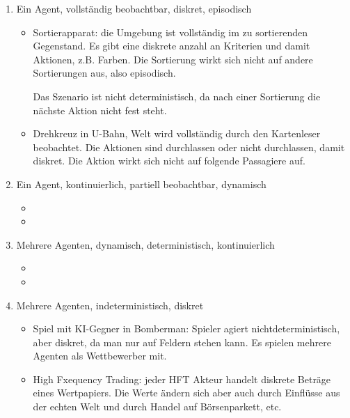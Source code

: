 \begin{enumerate}
	\item Ein Agent, vollständig beobachtbar, diskret, episodisch
	\begin{itemize}
		\item Sortierapparat: die Umgebung ist vollständig im zu sortierenden Gegenstand. Es gibt eine diskrete anzahl an Kriterien und damit Aktionen, z.B. Farben. Die Sortierung wirkt sich nicht auf andere Sortierungen aus, also episodisch.
		
		Das Szenario ist nicht deterministisch, da nach einer Sortierung die nächste Aktion nicht fest steht.
		
		\item Drehkreuz in U-Bahn, Welt wird vollständig durch den Kartenleser beobachtet. Die Aktionen sind durchlassen oder nicht durchlassen, damit diskret. Die Aktion wirkt sich nicht auf folgende Passagiere auf.
	\end{itemize}
	
	\item Ein Agent, kontinuierlich, partiell beobachtbar, dynamisch
	\begin{itemize}
		\item 
		
		\item 
	\end{itemize}
	
	\item Mehrere Agenten, dynamisch, deterministisch, kontinuierlich
	\begin{itemize}
		\item 
		
		\item 
	\end{itemize}
	
	\item Mehrere Agenten, indeterministisch, diskret
	\begin{itemize}
		\item Spiel mit KI-Gegner in Bomberman: Spieler agiert nichtdeterministisch, aber diskret, da man nur auf Feldern stehen kann. Es spielen mehrere Agenten als Wettbewerber mit.
		
		\item High Fxequency Trading: jeder HFT Akteur handelt diskrete Beträge eines Wertpapiers. Die Werte ändern sich aber auch durch Einflüsse aus der echten Welt und durch Handel auf Börsenparkett, etc.
	\end{itemize}
	
\end{enumerate}